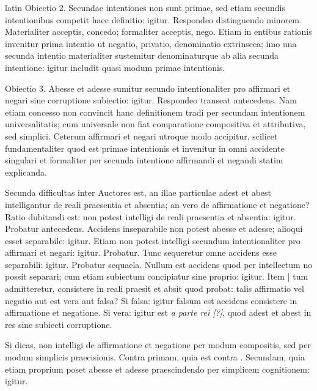 \begin{otherlanguage*}{latin}
\pstart
  Obiectio 2. Secundae intentiones non sunt primae, sed etiam secundis intentionibus competit haec definitio: igitur. Respondeo distinguendo minorem. Materialiter acceptis, concedo; formaliter acceptis, nego. Etiam in entibus rationis invenitur prima intentio ut negatio, privatio, denominatio extrinseca; imo una secunda intentio materialiter sustemitur denominaturque ab alia secunda intentione: igitur includit quasi modum primae intentionis. 
\pend

\pstart
  Obiectio 3. Abesse et adesse sumitur secundo intentionaliter pro affirmari et negari sine corruptione subiectio: igitur. Respondeo transeat antecedens. Nam etiam concesso non convincit hanc definitionem tradi per secundam intentionem universalitatis; cum universale non fiat comparatione compositiva et attributiva, sed simplici. Ceterum affirmari et negari utroque modo accipitur, scilicet fundamentaliter quod est primae intentionis et invenitur in omni accidente singulari et formaliter per secunda intentione affirmandi et negandi statim explicanda. 
\pend

\pstart
  Secunda difficultas inter Auctores est, an illae particulae adest et abest intelligantur de reali praesentia et absentia; an vero de affirmatione et negatione? Ratio dubitandi est: non potest intelligi de reali praesentia et absentia: igitur. Probatur antecedens. Accidens inseparabile non potest abesse et adesse; alioqui esset separabile: igitur. Etiam non potest intelligi secundum intentionaliter pro affirmari et negari: igitur. Probatur. Tunc sequeretur omne accidens esse separabili: igitur. Probatur sequaela. Nullum est accidens quod per intellectum no possit separari; cum etiam subiectum concipiatur sine proprio: igitur. Item \textnormal{|} tum admitteretur, consistere in reali praesit et absit quod probat: talis affirmatio vel negatio aut est vera aut falsa? Si falsa: igitur falsum est accidens consistere in affirmatione et negatione. Si vera: igitur est \emph{a parte rei [?]}, quod adest et abest in res sine subiecti corruptione. 
\pend

\pstart
  Si dicas, non intelligi de affirmatione et negatione per modum compositis, sed per modum simplicis praecisionis. Contra primam, quia est contra . Secundam, quia etiam proprium poset abesse et adesse praescindendo per simplicem cognitionem: igitur. 
\pend


\end{otherlanguage*}
